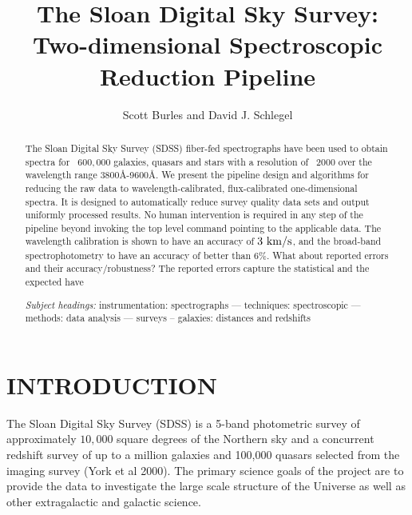 \documentclass[12pt,preprint]{aastex}
\newcommand{\kms}{{\rm ~km/s}}
\begin{document}
\title{The Sloan Digital Sky Survey: Two-dimensional Spectroscopic Reduction Pipeline}

\author{
Scott Burles\altaffilmark{\ref{email}}
and David J. Schlegel\altaffilmark{\ref{Princeton}}
}


\begin{abstract}
The Sloan Digital Sky Survey (SDSS) fiber-fed spectrographs have been used
to obtain spectra for ~$600,000$ galaxies, quasars and stars
with a resolution of ~2000 over the wavelength range 3800\AA -9600\AA.
We present the pipeline design and algorithms for reducing the raw data to
wavelength-calibrated, flux-calibrated one-dimensional spectra.
It is designed to automatically reduce survey quality data sets and output 
uniformly processed results.  No human intervention is required in any step 
of the pipeline beyond invoking the top level command pointing to the 
applicable data.
The wavelength calibration is shown to have an accuracy of $3 \kms$,
and the broad-band spectrophotometry to have an accuracy of better than $6\%$.
What about reported errors and their accuracy/robustness?
The reported errors capture the statistical and the expected have 

\emph{Subject headings: }
instrumentation: spectrographs --- techniques: spectroscopic --- 
methods: data analysis --- surveys -- galaxies: distances and redshifts
\end{abstract}

\section{INTRODUCTION}
\label{sec_intro}
The Sloan Digital Sky Survey (SDSS) is a 5-band photometric survey of
approximately $10,000$ square degrees of the Northern sky and a concurrent
redshift survey of up to a million galaxies and 100,000 quasars
selected from the imaging survey (York et al 2000).  The primary 
science goals of the project are to provide the data to investigate the
large scale structure of the Universe as well as other extragalactic and 
galactic science.
\end{document}
